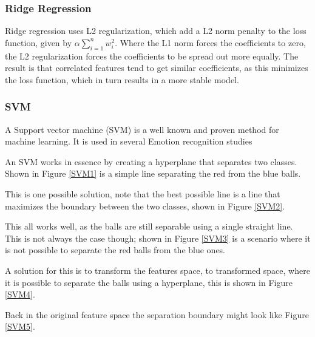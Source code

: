 \subsubsection{Ridge Regression}
Ridge regression uses L2 regularization, which add a L2 norm penalty to the loss function, given by $\alpha\sum\limits_{i=1}^{n} w_i^2$. Where the L1 norm forces the coefficients to zero, the L2 regularization forces the coefficients to be spread out more equally. The result is that correlated features tend to get similar coefficients, as this minimizes the loss function, which in turn results in a more stable model. 

\subsubsection{SVM}

A Support vector machine (SVM) is a well known and proven method for machine learning. It is used in several Emotion recognition studies %

An SVM works in essence by creating a hyperplane that separates two classes. Shown in Figure \ref{SVM1} is a simple line separating the red from the blue balls.


This is one possible solution, note that the best possible line is a line that maximizes the boundary between the two classes, shown in Figure \ref{SVM2}.


This all works well, as the balls are still separable using a single straight line. This is not always the case though; shown in Figure \ref{SVM3} is a scenario where it is not possible to separate the red balls from the blue ones.


A solution for this is to transform the features space, to transformed space, where it is possible to separate the balls using a hyperplane, this is shown in Figure \ref{SVM4}.


Back in the original feature space the separation boundary might look like Figure \ref{SVM5}.

